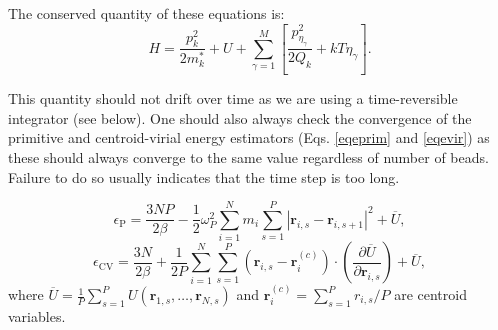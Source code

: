 The conserved quantity of these equations is:
\begin{equation}
H= \frac{p_k^2}{2m_k^*} + U + \sum_{\gamma=1}^M\left[\frac{p^2_{\eta_\gamma}}{2Q_k}+kT\eta_\gamma\right]   .
\end{equation}

This quantity should not drift over time as we are using a time-reversible integrator (see below). One should also always check the convergence of the primitive and centroid-virial energy estimators (Eqs. \ref{eqeprim} and \ref{eqevir}) as these should always converge to the same value regardless of number of beads. Failure to do so usually indicates that the time step is too long.


\begin{equation}
\epsilon_\mathrm{P}=\frac{3NP}{2\beta}-\frac{1}{2}\omega_P^2\sum_{i=1}^N m_i\sum_{s=1}^P |\mathbf{r}_{i,s}-\mathbf{r}_{i,s+1}|^2+\overline{U} ,
\label{eqeprim}
\end{equation}
\begin{equation}
\epsilon_{\mathrm{CV}}=\frac{3N}{2\beta}+\frac{1}{2P}\sum_{i=1}^N\sum_{s=1}^P(\mathbf{r}_{i,s}-\mathbf{r}_i^{(c)})\cdot\left(\frac{\partial \overline{U}}{\partial\mathbf{r}_{i,s}} \right)+\overline{U}  ,
\label{eqevir}
\end{equation}
where $\overline{U}=\frac{1}{P}\sum_{s=1}^P U(\mathbf{r}_{1,s},\dots,\mathbf{r}_{N,s})$ and $\mathbf{r}_i^{(c)}=\sum_{s=1}^Pr_{i,s}/P $ are centroid variables.


